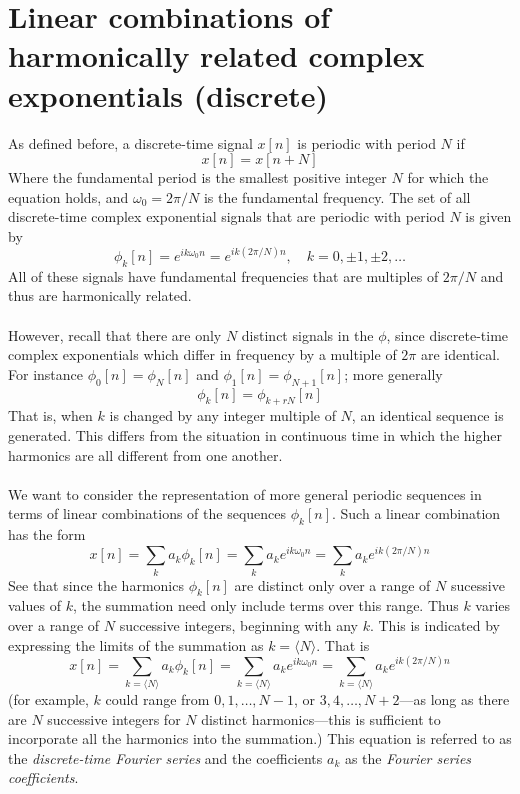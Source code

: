 \documentclass{report}
\begin{document}
\section{Linear combinations of harmonically related complex exponentials (discrete)}
As defined before, a discrete-time signal $x[n]$ is periodic with period $N$ if
\begin{equation*}
x[n]=x[n+N]
\end{equation*}
Where the fundamental period is the smallest positive integer $N$ for which the equation holds, and $\omega_0=2\pi/N$ is the fundamental frequency. The set of all discrete-time complex exponential 
signals that are periodic with period $N$ is given by
\begin{equation*}
\phi_k[n]=e^{ik\omega_0n}=e^{ik(2\pi/N)n},\quad k=0,\pm1,\pm2,\ldots
\end{equation*}
All of these signals have fundamental frequencies that are multiples of $2\pi/N$ and thus are harmonically related.\\
\vspace{1mm}\\
However, recall that there are only $N$ distinct signals in the $\phi$, since discrete-time complex exponentials which differ in frequency by a multiple of $2\pi$ are identical. For instance
$\phi_0[n]=\phi_N[n]$ and $\phi_1[n]=\phi_{N+1}[n]$; more generally
\begin{equation*}
\phi_k[n]=\phi_{k+rN}[n]
\end{equation*}
That is, when $k$ is changed by any integer multiple of $N$, an identical sequence is generated. This differs from the situation in continuous time in which the higher harmonics are all different from
one another.\\
\vspace{1mm}\\
We want to consider the representation of more general periodic sequences in terms of linear combinations of the sequences $\phi_k[n]$. Such a linear combination has the form
\begin{equation*}
x[n]=\sum_ka_k\phi_k[n]=\sum_ka_ke^{ik\omega_0n}=\sum_ka_ke^{ik(2\pi/N)n}
\end{equation*}
See that since the harmonics $\phi_k[n]$ are distinct only over a range of $N$ sucessive values of $k$, the summation need only include terms over this range. Thus $k$ varies over a range of $N$ 
successive integers, beginning with any $k$. This is indicated by expressing the limits of the summation as $k=\langle N\rangle$. That is
\begin{equation*}
x[n]=\sum_{k=\langle N\rangle}a_k\phi_k[n]=\sum_{k=\langle N\rangle}a_ke^{ik\omega_0n}=\sum_{k=\langle N\rangle}a_ke^{ik(2\pi/N)n}
\end{equation*}
(for example, $k$ could range from $0,1,\ldots,N-1$, or $3,4,\ldots,N+2$---as long as there are $N$ successive integers for $N$ distinct harmonics---this is sufficient to incorporate all the harmonics
into the summation.) This equation is referred to as the \textit{discrete-time Fourier series} and the coefficients $a_k$ as the \textit{Fourier series coefficients}.
\newpage
\end{document}
